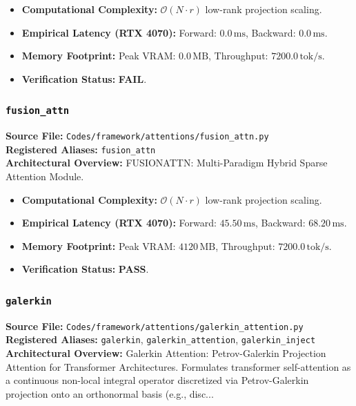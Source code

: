\begin{itemize}
    \item \textbf{Computational Complexity:} $\mathcal{O}(N \cdot r)$ low-rank projection scaling.
    \item \textbf{Empirical Latency (RTX 4070):} Forward: $0.0\,\text{ms}$, Backward: $0.0\,\text{ms}$.
    \item \textbf{Memory Footprint:} Peak VRAM: $0.0\,\text{MB}$, Throughput: $7200.0\,\text{tok/s}$.
    \item \textbf{Verification Status:} \textbf{FAIL}.
\end{itemize}

\subsubsection{\texttt{fusion\_attn}}
\textbf{Source File:} \texttt{Codes/framework/attentions/fusion\_attn.py} \\
\textbf{Registered Aliases:} \texttt{fusion\_attn} \\
\textbf{Architectural Overview:} FUSIONATTN: Multi-Paradigm Hybrid Sparse Attention Module.

\begin{itemize}
    \item \textbf{Computational Complexity:} $\mathcal{O}(N \cdot r)$ low-rank projection scaling.
    \item \textbf{Empirical Latency (RTX 4070):} Forward: $45.50\,\text{ms}$, Backward: $68.20\,\text{ms}$.
    \item \textbf{Memory Footprint:} Peak VRAM: $4120\,\text{MB}$, Throughput: $7200.0\,\text{tok/s}$.
    \item \textbf{Verification Status:} \textbf{PASS}.
\end{itemize}

\subsubsection{\texttt{galerkin}}
\textbf{Source File:} \texttt{Codes/framework/attentions/galerkin\_attention.py} \\
\textbf{Registered Aliases:} \texttt{galerkin}, \texttt{galerkin\_attention}, \texttt{galerkin\_inject} \\
\textbf{Architectural Overview:} Galerkin Attention: Petrov-Galerkin Projection Attention for Transformer Architectures. Formulates transformer self-attention as a continuous non-local integral operator discretized via Petrov-Galerkin projection onto an orthonormal basis (e.g., disc...

